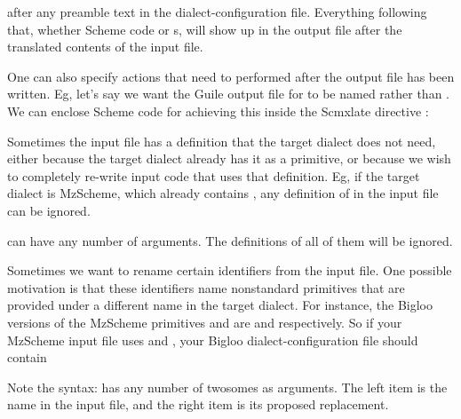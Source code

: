 
\n after any preamble text in the dialect-configuration
file.  Everything following that, whether Scheme
code or s, will show up in the
output file after the translated contents of the input
file.


One can also specify actions that need to performed
after the output file has been written.  Eg, let's say
we want the Guile output file for  to be
named  rather than .  We can
enclose Scheme code for achieving this inside the
Scmxlate directive :



Sometimes the input file has a definition that the
target dialect does not need, either because the target
dialect already has it as a primitive, or because we
wish to completely re-write input code that uses that
definition.  Eg, if the target dialect is MzScheme,
which already contains , any definition of
 in the input file can be ignored.


 can have any number of
arguments.  The definitions of all of them will be
ignored.


Sometimes we want to rename certain identifiers from
the input file.  One possible motivation is that
these identifiers name nonstandard primitives that are
provided under a different name in the target dialect.
For instance, the Bigloo versions of the MzScheme
primitives  and
 are  and
 respectively.  So if your
MzScheme input file uses  and
, your Bigloo
dialect-configuration file should contain


Note the syntax:  has any number of
twosomes as arguments.  The left item is the name in
the input file, and the right item is its proposed
replacement.


